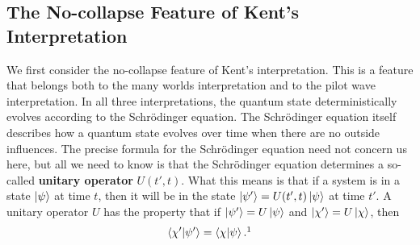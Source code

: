 \subsection{The No-collapse Feature of Kent's Interpretation}
We first consider the no-collapse feature of Kent's interpretation. This is a feature that belongs both to the many worlds interpretation and to the pilot wave interpretation. In all three interpretations, the quantum state deterministically evolves according to the Schr\"{o}dinger equation. The Schr\"{o}dinger equation itself describes how a quantum state evolves over time when there are no outside influences. The precise formula for the Schr\"{o}dinger equation need not concern us here, but all we need to know is that the Schr\"{o}dinger equation determines a so-called \textbf{unitary operator} $U(t',t)$. What this means is that if a system is in a state $\ket{\psi}$ at time $t$, then it will be in the state $\ket{\psi'}=U(t',t)\ket{\psi}$
at time $t'$. A unitary operator $U$ has the property that if $\ket{\psi'}=U\ket{\psi}$ and $\ket{\chi'}=U\ket{\chi}$, then 
\begin{equation}\label{unitarycond}
\ip{\chi'}{\psi'}=\ip{\chi}{\psi}.\protect\footnotemark
\end{equation}
